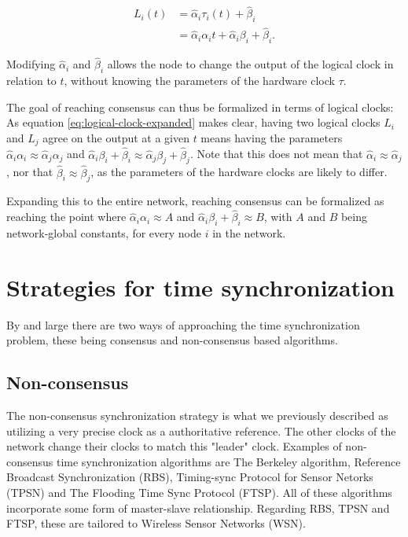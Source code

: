 \documentclass[a4paper,12pt]{article}
\begin{document}
\begin{align}
    L_i(t) &= \hat\alpha_i \tau_i(t) + \hat\beta_i \nonumber \\
        &= \hat\alpha_i \alpha_i t + \hat\alpha_i \beta_i + \hat\beta_i. \label{eq:logical-clock-expanded}
\end{align}

Modifying $\hat\alpha_i$ and $\hat\beta_i$ allows the node to change the output of the logical clock in relation to $t$, without knowing the parameters of the hardware clock $\tau$.

The goal of reaching consensus can thus be formalized in terms of logical clocks: As equation \ref{eq:logical-clock-expanded} makes clear, having two logical clocks $L_i$ and $L_j$ agree on the output at a given $t$ means having the parameters $\hat\alpha_i \alpha_i \approx \hat\alpha_j \alpha_j$ and $\hat\alpha_i \beta_i + \hat\beta_i \approx \hat\alpha_j \beta_j + \hat\beta_j$. Note that this does not mean that $\hat\alpha_i \approx \hat\alpha_j$, nor that $\hat\beta_i \approx \hat\beta_j$, as the parameters of the hardware clocks are likely to differ.

Expanding this to the entire network, reaching consensus can be formalized as reaching the point where $\hat\alpha_i \alpha_i \approx A$ and $\hat\alpha_i \beta_i + \hat\beta_i \approx B$, with $A$ and $B$ being network-global constants, for every node $i$ in the network.


\section{Strategies for time synchronization}


By and large there are two ways of approaching the time synchronization problem, these being consensus and non-consensus based algorithms.

    \subsection{Non-consensus}
    The non-consensus synchronization strategy is what we previously described as utilizing a very precise clock as a authoritative reference. The other clocks of the network change their clocks to match this "leader" clock.
    Examples of non-consensus time synchronization algorithms are The Berkeley algorithm, Reference Broadcast Synchronization (RBS), Timing-sync Protocol for Sensor Netorks (TPSN) and The Flooding Time Sync Protocol (FTSP). All of these algorithms incorporate some form of master-slave relationship. Regarding RBS, TPSN and FTSP, these are tailored to Wireless Sensor Networks (WSN).
    
\end{document}
